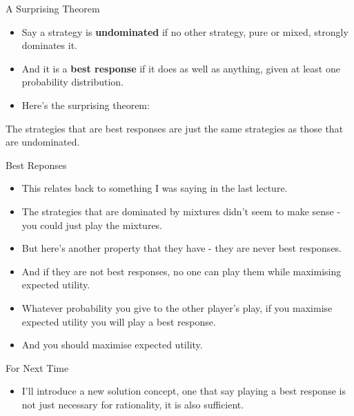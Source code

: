 \documentclass[
  ignorenonframetext,
]{beamer}
\providecommand{\tightlist}{%
  \setlength{\itemsep}{0pt}\setlength{\parskip}{0pt}}
\renewenvironment*{quote}	
	{\list{}{\rightmargin   \leftmargin} \item } 	
	{\endlist }
\begin{document}
\begin{frame}{A Surprising Theorem}
\protect\hypertarget{a-surprising-theorem}{}
\begin{itemize}
\tightlist
\item
  Say a strategy is \textbf{undominated} if no other strategy, pure or
  mixed, strongly dominates it. \pause
\item
  And it is a \textbf{best response} if it does as well as anything,
  given at least one probability distribution.\pause
\item
  Here's the surprising theorem:
\end{itemize}

\begin{quote}
The strategies that are best responses are just the same strategies as
those that are undominated.
\end{quote}
\end{frame}

\begin{frame}{Best Reponses}
\protect\hypertarget{best-reponses}{}
\begin{itemize}
\tightlist
\item
  This relates back to something I was saying in the last lecture.
\item
  The strategies that are dominated by mixtures didn't seem to make
  sense - you could just play the mixtures.
\item
  But here's another property that they have - they are never best
  responses.
\item
  And if they are not best responses, no one can play them while
  maximising expected utility.
\item
  Whatever probability you give to the other player's play, if you
  maximise expected utility you will play a best response.
\item
  And you should maximise expected utility.
\end{itemize}
\end{frame}

\begin{frame}{For Next Time}
\protect\hypertarget{for-next-time}{}
\begin{itemize}
\tightlist
\item
  I'll introduce a new solution concept, one that say playing a best
  response is not just necessary for rationality, it is also sufficient.
\end{itemize}
\end{frame}
\end{document}
